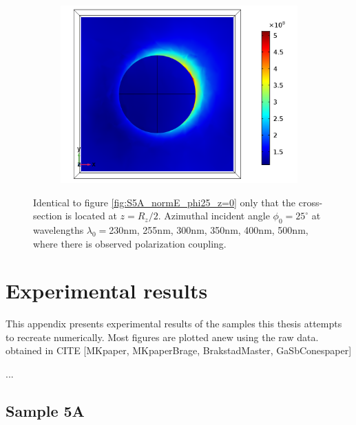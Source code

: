 \begin{figure}[htb!]
\begin{subfigure}{0.32\textwidth}
        \centering
        \includegraphics[width=\linewidth]{figures/ch4/S5A/FieldDistribution/phi25/z2/Sample5A_TM_Slice@z=+05Rz_wl=500_phi=25.png}
   \end{subfigure}
   \vspace{0.7cm}
   \caption{Identical to figure \ref{fig:S5A_normE_phi25_z=0} only that the cross-section is located at $z=R_z/2$. Azimuthal incident angle $\phi_0=25^\circ$ at wavelengths $\lambda_0=$230nm, 255nm, 300nm, 350nm, 400nm, 500nm, where there is observed polarization coupling.}
   \label{fig:5.10}   
\end{figure}

\chapter{Experimental results}
This appendix presents experimental results of the samples this thesis attempts to recreate numerically. Most figures are plotted anew using the raw data. obtained in CITE [MKpaper, MKpaperBrage, BrakstadMaster, GaSbConespaper]

...


\section{Sample 5A}

